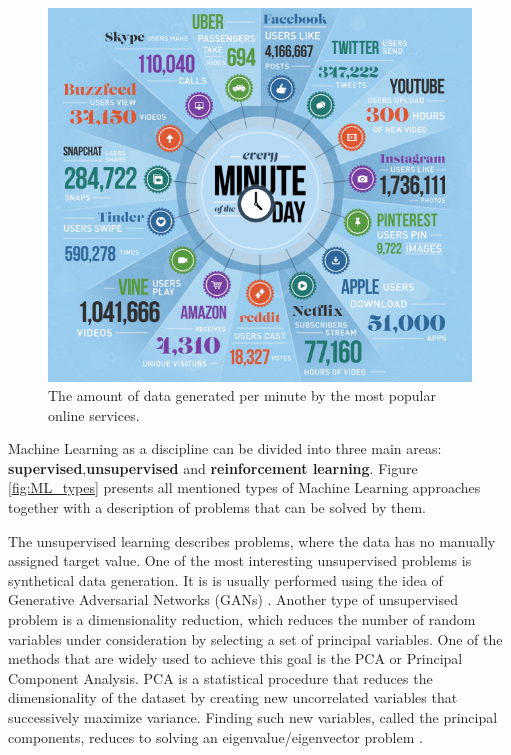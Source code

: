 \begin{figure}[h]
\centering
\includegraphics[scale=0.8]{figures/big_data.jpg}
\caption{The amount of data generated per minute by the most popular online services.
\label{fig:big_data}}
\end{figure}

Machine Learning as a discipline can be divided into three main areas: \textbf{supervised},\textbf{unsupervised} and \textbf{reinforcement learning}. Figure \ref{fig:ML_types} presents all mentioned types of Machine Learning approaches together with a description of problems that can be solved by them. 

The unsupervised learning describes problems, where the data has no manually assigned target value. One of the most interesting unsupervised problems is synthetical data generation. It is is usually performed using the idea of Generative Adversarial Networks (GANs) \cite{GAN}. Another type of unsupervised problem is a dimensionality reduction, which reduces the number of random variables under consideration by selecting a set of principal variables. 
One of the methods that are widely used to achieve this goal is the PCA or Principal Component Analysis. 
PCA is a statistical procedure that reduces the dimensionality of the dataset by creating new uncorrelated variables that successively maximize variance. Finding such new variables, called the principal components, reduces to solving an eigenvalue/eigenvector problem \cite{PCA}. 

